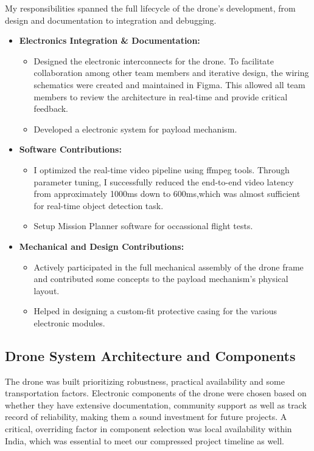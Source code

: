 My responsibilities spanned the full lifecycle of the drone's development, from design and documentation to integration and debugging.

\noindent
\begin{itemize}
	\item \textbf{Electronics Integration \& Documentation:}
	      \begin{itemize}
		      \item Designed the electronic interconnects for the drone. To facilitate collaboration among other team members and iterative design, the wiring schematics were created and maintained in Figma. This allowed all team members to review the architecture in real-time and provide critical feedback.
		      \item Developed a electronic system for payload mechanism.
	      \end{itemize}
	\item  \textbf{Software Contributions:}
	      \begin{itemize}
		      \item I optimized the real-time video pipeline using ffmpeg tools. Through parameter tuning, I successfully reduced the end-to-end video latency from approximately 1000ms down to 600ms,which was almost sufficient for real-time object detection task.
		      \item Setup Mission Planner software for occassional flight tests.
	      \end{itemize}

	\item \textbf{Mechanical and Design Contributions:}
	      \begin{itemize}
		      \item Actively participated in the full mechanical assembly of the drone frame and contributed some concepts to the payload mechanism's physical layout.
		      \item Helped in designing a custom-fit protective casing for the various electronic modules.
	      \end{itemize}
\end{itemize}


\subsection{Drone System Architecture and Components}

The drone was built prioritizing robustness, practical availability and some transportation factors. Electronic components of the drone were chosen based on whether they have extensive documentation, community support as well as track record of reliability, making them a sound investment for future projects. A critical, overriding factor in component selection was local availability within India, which was essential to meet our compressed project timeline as well.

